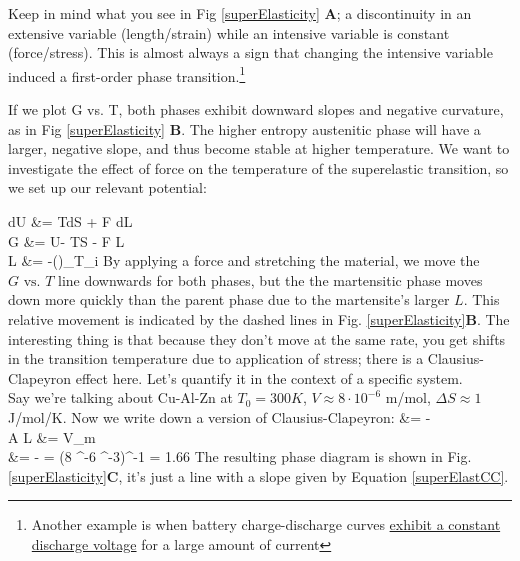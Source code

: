 \documentclass[12pt]{article}
\begin{document}
Keep in mind what you see in Fig \ref{superElasticity} \textbf{A}; a discontinuity in an extensive variable (length/strain) while an intensive variable is constant (force/stress). This is almost always a sign that changing the intensive variable induced a first-order phase transition.\footnote{Another example is when battery charge-discharge curves \href{http://i.stack.imgur.com/UkodS.gif}{exhibit a constant discharge voltage} for a large amount of current}

If we plot G vs. T, both phases exhibit downward slopes and negative curvature, as in Fig \ref{superElasticity} \textbf{B}. The higher entropy austenitic phase will have a larger, negative slope, and thus become stable at higher temperature. We want to investigate the effect of force on the temperature of the superelastic transition, so we set up our relevant potential:

\eqs
dU &= TdS + F dL\\
G &= U- T\cdot S - F \cdot L\\
L &= -\left(\right)_{T_i}
\eqe
By applying a force and stretching the material, we move the $G\text{ vs. }T$ line downwards for both phases, but the the martensitic phase moves down more quickly than the parent phase due to the martensite's larger $L$. This relative movement is indicated by the dashed lines in Fig. \ref{superElasticity}\textbf{B}. The interesting thing is that because they don't move at the same rate, you get shifts in the transition temperature due to application of stress; there is a Clausius-Clapeyron effect here. Let's quantify it in the context of a specific system.\\

Say we're talking about Cu-Al-Zn at $T_0 = 300K$, $V \approx 8 \cdot 10^{-6}$ m\three/mol, $\Delta S \approx 1$ J/mol/K.  Now we write down a version of Clausius-Clapeyron:
\eqs
{}  &= -\\
A \Delta L &= V_m \Delta \epsilon\\
 &= - = (8 ^-6  ^{-3})^{-1} = 1.66 
\label{superElastCC}
\eqe
The resulting phase diagram is shown in Fig. \ref{superElasticity}\textbf{C}, it's just a line with a slope given by Equation \ref{superElastCC}.
\end{document}
